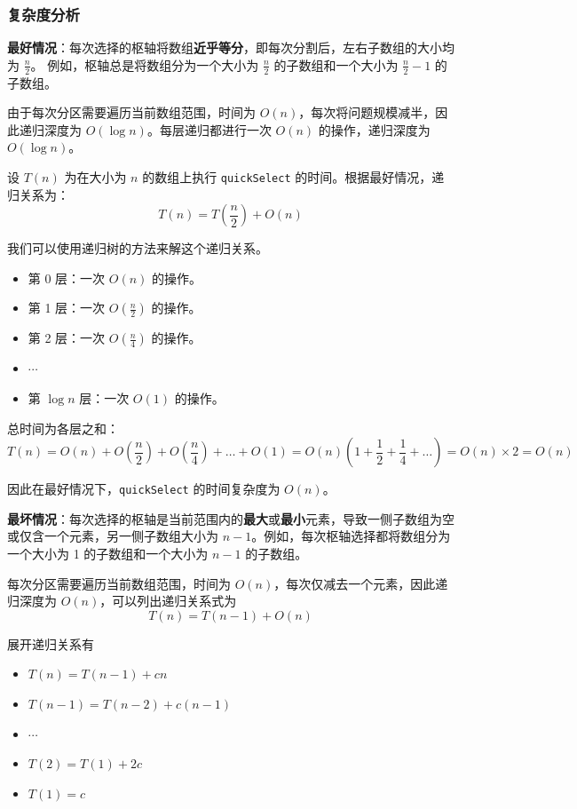 \subsubsection{复杂度分析}

\textbf{最好情况}：每次选择的枢轴将数组\textbf{近乎等分}，即每次分割后，左右子数组的大小均为 $\frac{n}{2} $。	例如，枢轴总是将数组分为一个大小为 $\frac{n}{2}$ 的子数组和一个大小为 $\frac{n}{2} - 1$ 的子数组。

由于每次分区需要遍历当前数组范围，时间为 $O(n)$，每次将问题规模减半，因此递归深度为 $O(\log n)$。每层递归都进行一次 $O(n)$ 的操作，递归深度为 $O(\log n)$。

设 $T(n)$ 为在大小为 $n$ 的数组上执行 \texttt{quickSelect} 的时间。根据最好情况，递归关系为：
\[T(n) = T\left(\frac{n}{2}\right) + O(n)\]

我们可以使用递归树的方法来解这个递归关系。\begin{itemize}
    \item 第 0 层：一次 $O(n)$ 的操作。
    \item 第 1 层：一次 $O(\frac{n}{2})$ 的操作。
    \item 第 2 层：一次 $O(\frac{n}{4})$ 的操作。
    \item $\cdots$
    \item 第 $\log n$ 层：一次 $O(1)$ 的操作。
\end{itemize}

总时间为各层之和：\[T(n) = O(n) + O\left(\frac{n}{2}\right) + O\left(\frac{n}{4}\right) + \dots + O(1) = O(n) \left(1 + \frac{1}{2} + \frac{1}{4} + \dots \right) = O(n) \times 2 = O(n)\]

因此在最好情况下，\texttt{quickSelect} 的时间复杂度为 $O(n)$。

\textbf{最坏情况}：每次选择的枢轴是当前范围内的\textbf{最大}或\textbf{最小}元素，导致一侧子数组为空或仅含一个元素，另一侧子数组大小为 $n - 1$。例如，每次枢轴选择都将数组分为一个大小为 1 的子数组和一个大小为 $n - 1$ 的子数组。

每次分区需要遍历当前数组范围，时间为 $O(n)$，每次仅减去一个元素，因此递归深度为 $O(n)$，可以列出递归关系式为\[T(n) = T(n - 1) + O(n)\]

展开递归关系有 \begin{itemize}
    \item $T(n)=T(n-1)+cn$
    \item $T(n-1)=T(n-2)+c(n-1)$
    \item $\cdots$
    \item $T(2)=T(1)+2c$
    \item $T(1)=c$
\end{itemize}

